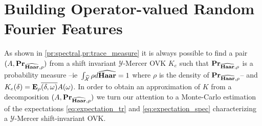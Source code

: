 \section{Building Operator-valued Random Fourier Features}
\label{sec:building_ORFF} As shown in \cref{pr:spectral,pr:trace_measure} it is
always possible to find a pair $(A, {\mathbf{{Pr}}}_{\widehat{\mathbf{Haar}},\rho})$ from a
shift invariant $\mathcal{Y}$-Mercer \acl{OVK} $K_e$ such that
${\mathbf{{Pr}}}_{\widehat{\mathbf{Haar}},\rho}$ is a probability measure
--\acs{ie}~$\int_{\widehat{\mathcal{X}}} \rho d\widehat{\mathbf{Haar}}=1$ where $\rho$ is the
density of ${\mathbf{{Pr}}}_{\widehat{\mathbf{Haar}},\rho}$-- and
$K_e(\delta)={\mathbf{{E}}}_\rho{\overline{(\delta,\omega)}A(\omega)}$. In
order to obtain an approximation of $K$ from a decomposition $(A,
{\mathbf{{Pr}}}_{\widehat{\mathbf{Haar}},\rho})$ we turn our attention to a Monte-Carlo
estimation of the expectations \cref{eq:expectation_tr} and
\cref{eq:expectation_spec} characterizing a $\mathcal{Y}$-Mercer
shift-invariant \acl{OVK}.
